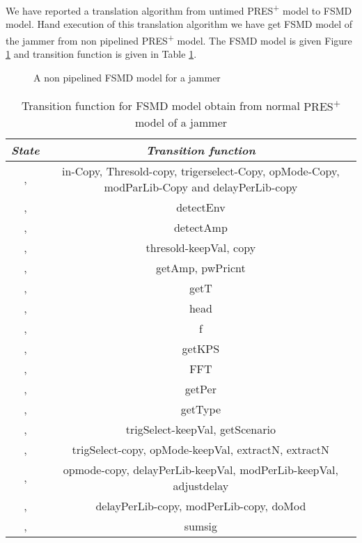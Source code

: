 \documentclass[9pt,executive]{article}
\def\presp{PRES\textsuperscript{+}}
\def\fsmd{FSMD}
\def\presp{PRES\textsuperscript{+}}
\def\fsmd{FSMD}
\begin{document}
We have reported a translation algorithm from untimed {\presp} model to {\fsmd} model. Hand execution of
this translation algorithm we have get {\fsmd}  model of the jammer from non pipelined {\presp} model. 
The {\fsmd} model is given Figure \ref{fig:jfsmd} and transition function is given in Table \ref{F:comp1}.
\begin{figure}[htbp]
\centerline{}
\caption{A non pipelined {\fsmd} model for a jammer}
\label{fig:jfsmd}
\end{figure}
\begin{table}[t]
  \begin{center}
    \small\addtolength{\tabcolsep}{-5pt}
\begin{tabular}{|c|c|} \hline 
\emph{State}                           & \emph{Transition function}              \\
               
\hline
 ,           &  in-Copy, Thresold-copy, trigerselect-Copy, opMode-Copy,  modParLib-Copy and delayPerLib-copy   \\ 
 \hline                                              
 ,           &  detectEnv                                                                 \\ 
\hline
 ,           &   detectAmp                                                                                  \\  
\hline
 ,           &  thresold-keepVal, copy                                                                               \\    
\hline
 ,           &  getAmp, pwPricnt                                                                              \\             
\hline
 ,           & getT                           \\ 
\hline
 ,           & head                                                                \\ 
\hline
 ,            & f                                                                                                       \\
\hline 
 ,           & getKPS            \\
\hline
 ,            & FFT                      \\
\hline
 ,            & getPer\\
\hline
 ,          & getType \\
\hline 
 ,         & trigSelect-keepVal, getScenario\\
\hline 
 ,          &trigSelect-copy, opMode-keepVal, extractN, extractN \\
\hline 
 ,           & opmode-copy, delayPerLib-keepVal, modPerLib-keepVal, adjustdelay\\
\hline 
 ,            & delayPerLib-copy, modPerLib-copy, doMod\\
\hline
  ,           & sumsig\\
\hline
\end{tabular}
\end{center}
\caption{Transition function for {\fsmd} model obtain from normal {\presp} model of a jammer}
\label{F:comp1}
\end{table}
\end{document}
